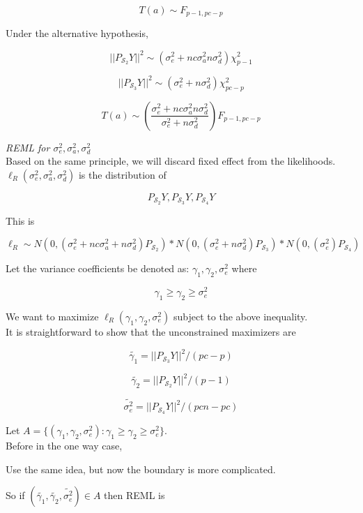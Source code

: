 \documentclass[11pt,fleqn]{book} %
\begin{document}
		$$T(a) \sim F_{p - 1, pc - p} $$

Under the alternative hypothesis, 

		$$|| P_{\mathcal{S}_2} Y||^2 \sim (\sigma_e^2 + nc\sigma^2_a n\sigma_d^2) \chi^2_{p-1} $$


		$$|| P_{\mathcal{S}_3} Y||^2 \sim (\sigma_e^2 + n\sigma^2_d) \chi^2_{pc-p} $$

		$$T(a) \sim  (\frac{\sigma_e^2 + nc\sigma^2_a n\sigma_d^2}{\sigma_e^2 + n\sigma^2_d}) F_{p - 1, pc - p} $$


\textit{REML for $\sigma_e^2, \sigma_a^2, \sigma_d^2$}\\

Based on the same principle, we will discard fixed effect from the likelihoods. $\ell_R(\sigma_e^2, \sigma_a^2, \sigma_d^2)$ is the distribution of 

		$$ P_{\mathcal{S}_2}Y, P_{\mathcal{S}_3}Y, P_{\mathcal{S}_4}Y$$

This is

		$$\ell_R \sim N(0, (\sigma_e^2  + nc\sigma_a^2 + n\sigma_d^2)P_{\mathcal{S}_2})* 
					N(0, (\sigma_e^2  + n\sigma_d^2)P_{\mathcal{S}_3})* 
					N(0, (\sigma_e^2 )P_{\mathcal{S}_4})$$

Let the variance coefficients be denoted as: $\gamma_1, \gamma_2, \sigma_e^2$ where

		$$\gamma_1 \geq \gamma_2 \geq \sigma_e^2 $$


We want to maximize $\ell_R( \gamma_1, \gamma_2, \sigma_e^2)$ subject to the above inequality. \\

It is straightforward to show that the unconstrained maximizers are
	
	$$\tilde{\gamma_1} = || P_{\mathcal{S}_3} Y||^2 / (pc - p) $$

	$$\tilde{\gamma_2} = || P_{\mathcal{S}_2} Y||^2 / (p - 1) $$

	$$\tilde{\sigma_e^2} = || P_{\mathcal{S}_4} Y||^2 / (pcn - pc) $$


Let $ A = \{ (\gamma_1, \gamma_2, \sigma_e^2): \gamma_1 \geq \gamma_2 \geq \sigma_e^2\}$. \\

Before in the one way case, 


Use the same idea, but now the boundary is more complicated. 



So if $(\tilde{\gamma_1}, \tilde{\gamma_2}, \tilde{\sigma_e^2}) \in A$ then REML is 
\end{document}
